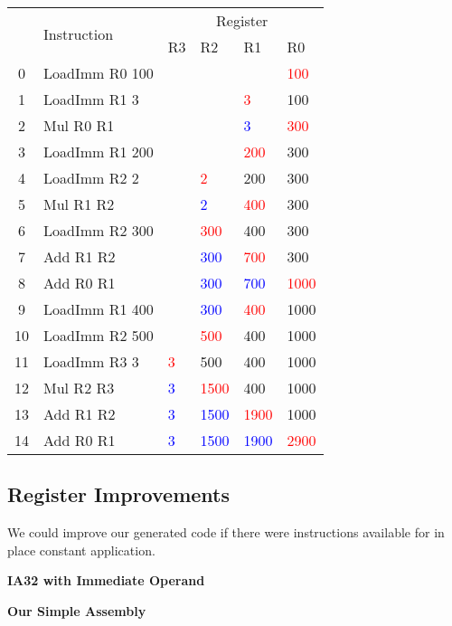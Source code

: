 \documentclass{report}
\newcommand{\hot}[1]{\textcolor{red}{#1}}
\newcommand{\old}[1]{\textcolor{blue}{#1}}
\begin{document}
        \begin{center}
            \begin{tabular}{c l | l l l l}
                & \multirow{2}{*}{Instruction} & \multicolumn{4}{c}{Register} \\
                & & R3 & R2 & R1 & R0 \\
                \hline
                0 &LoadImm R0 100&       &          &          & \hot{100}\\ 
                1 &LoadImm R1 3  &       &          &   \hot{3}&       100\\ 
                2 &Mul R0 R1     &       &          &  \old{3} & \hot{300}\\ 
                3 &LoadImm R1 200&       &          & \hot{200}&       300\\ 
                4 &LoadImm R2 2  &       &\hot{2}   &       200&       300\\ 
                5 &Mul R1 R2     &       &   \old{2}& \hot{400}&       300\\ 
                6 &LoadImm R2 300&       &\hot{300} &       400&       300\\ 
                7 &Add R1 R2     &       & \old{300}& \hot{700}&       300\\ 
                8 &Add R0 R1     &       & \old{300}& \old{700}&\hot{1000}\\ 
                9 &LoadImm R1 400&       & \old{300}& \hot{400}&      1000\\ 
               10 &LoadImm R2 500&       &\hot{500} &       400&      1000\\ 
               11 &LoadImm R3 3  &\hot{3}&       500&       400&      1000\\ 
               12 &Mul R2 R3     &\old{3}&\hot{1500}&       400&      1000\\ 
               13 &Add R1 R2     &\old{3}&\old{1500}&\hot{1900}&      1000\\ 
               14 &Add R0 R1     &\old{3}&\old{1500}&\old{1900}&\hot{2900}\\
            \end{tabular}
        \end{center}
        \subsection*{Register Improvements}
            We could improve our generated code if there were instructions available for in place constant application.
            \\ \begin{minipage}[t]{0.4\textwidth}
                \centerline{\textbf{IA32 with Immediate Operand}}
            \end{minipage}
            \hfill
            \begin{minipage}[t]{0.4\textwidth}
                \centerline{\textbf{Our Simple Assembly}}
            \end{minipage}
\end{document}
